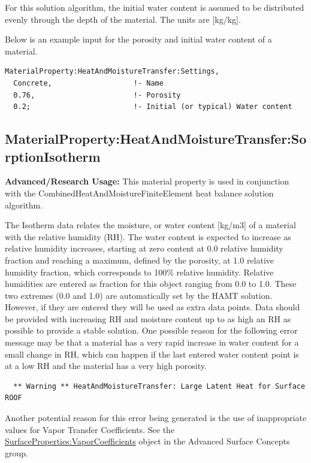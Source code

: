 For this solution algorithm, the initial water content is assumed to be distributed evenly through the depth of the material. The units are {[}kg/kg{]}.

Below is an example input for the porosity and initial water content of a material.

\begin{lstlisting}
MaterialProperty:HeatAndMoistureTransfer:Settings,
  Concrete,                   !- Name
  0.76,                       !- Porosity
  0.2;                        !- Initial (or typical) Water content
\end{lstlisting}

\subsection{MaterialProperty:HeatAndMoistureTransfer:SorptionIsotherm}\label{materialpropertyheatandmoisturetransfersorptionisotherm}

\textbf{Advanced/Research Usage:} This material property is used in conjunction with the CombinedHeatAndMoistureFiniteElement heat balance solution algorithm.

The Isotherm data relates the moisture, or water content {[}kg/m3{]} of a material with the relative humidity (RH). The water content is expected to increase as relative humidity increases, starting at zero content at 0.0 relative humidity fraction and reaching a maximum, defined by the porosity, at 1.0 relative humidity fraction, which corresponds to 100\% relative humidity. Relative humidities are entered as fraction for this object ranging from 0.0 to 1.0. These two extremes (0.0 and 1.0) are automatically set by the HAMT solution. However, if they are entered they will be used as extra data points. Data should be provided with increasing RH and moisture content up to as high an RH as possible to provide a stable solution. One possible reason for the following error message may be that a material has a very rapid increase in water content for a small change in RH, which can happen if the last entered water content point is at a low RH and the material has a very high porosity.

\begin{lstlisting}
  ** Warning ** HeatAndMoistureTransfer: Large Latent Heat for Surface ROOF
\end{lstlisting}

Another potential reason for this error being generated is the use of inappropriate values for Vapor Transfer Coefficients. See the \hyperref[surfacepropertiesvaporcoefficients]{SurfaceProperties:VaporCoefficients} object in the Advanced Surface Concepts group.

